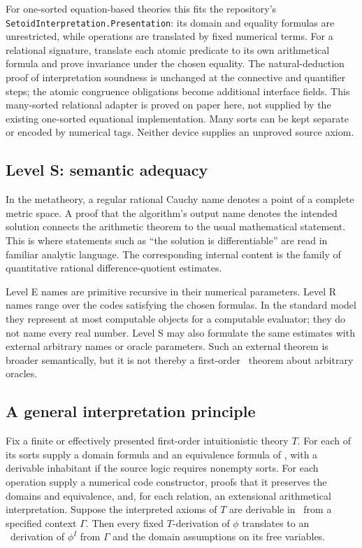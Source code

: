 For one-sorted equation-based theories this fits the repository's
\texttt{SetoidInterpretation.\allowbreak Presentation}: its domain and equality formulas
are unrestricted, while operations are translated by fixed numerical terms.
For a relational signature, translate each atomic predicate to its own
arithmetical formula and prove invariance under the chosen equality. The
natural-deduction proof of interpretation soundness is unchanged at the
connective and quantifier steps; the atomic congruence obligations become
additional interface fields. This many-sorted relational adapter is proved on paper here,
not supplied by the existing one-sorted equational implementation. Many sorts can be kept separate or encoded by
numerical tags. Neither device supplies an unproved source axiom.

\subsection{Level S: semantic adequacy}

In the metatheory, a regular rational Cauchy name denotes a point of a complete
metric space. A proof that the algorithm's output name denotes the intended
solution connects the arithmetic theorem to the usual mathematical statement.
This is where statements such as ``the solution is differentiable'' are read
in familiar analytic language. The corresponding internal content is the
family of quantitative rational difference-quotient estimates.

Level E names are primitive recursive in their numerical parameters. Level R
names range over the codes satisfying the chosen formulas. In the standard
model they represent at most computable objects for a computable evaluator;
they do not name every real number. Level S may also formulate the same
estimates with external arbitrary names or oracle parameters. Such an
external theorem is broader semantically, but it is not thereby a
first-order \ipra\ theorem about arbitrary oracles.

\subsection{A general interpretation principle}

\begin{theorem}\label{thm:interpretation}
Fix a finite or effectively presented first-order intuitionistic theory $T$.
For each of its sorts supply a domain formula and an equivalence formula of
\ipra, with a derivable inhabitant if the source logic requires nonempty sorts.
For each operation supply a numerical code constructor, proofs that it
preserves the domains and equivalence, and, for each relation, an extensional
arithmetical interpretation. Suppose the interpreted axioms of $T$ are
derivable in \ipra\ from a specified context $\Gamma$.
Then every fixed $T$-derivation of $\phi$ translates to an \ipra\ derivation
of $\phi^I$ from $\Gamma$ and the domain assumptions on its free variables.
\end{theorem}

